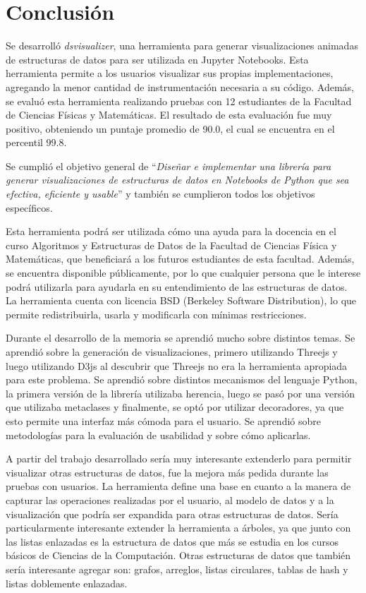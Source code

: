 \chapter{Conclusión}


Se desarrolló \textit{dsvisualizer}, una herramienta para generar visualizaciones animadas de estructuras de datos para ser utilizada en Jupyter Notebooks. Esta herramienta permite a los usuarios visualizar sus propias implementaciones, agregando la menor cantidad de instrumentación necesaria a su código. Además, se evaluó esta herramienta realizando pruebas con 12 estudiantes de la Facultad de Ciencias Físicas y Matemáticas. El resultado de esta evaluación fue muy positivo, obteniendo un puntaje promedio de 90.0, el cual se encuentra en el percentil 99.8.

Se cumplió el objetivo general de ``\textit{Diseñar e implementar una librería para generar visualizaciones de estructuras de datos en Notebooks de Python que sea efectiva, eficiente y usable}'' y también se cumplieron todos los objetivos específicos.

Esta herramienta podrá ser utilizada cómo una ayuda para la docencia en el curso Algoritmos y Estructuras de Datos de la Facultad de Ciencias Física y Matemáticas, que beneficiará a los futuros estudiantes de esta facultad. Además, se encuentra disponible públicamente, por lo que cualquier persona que le interese podrá utilizarla para ayudarla en su entendimiento de las estructuras de datos. La herramienta cuenta con licencia BSD (Berkeley Software Distribution), lo que permite redistribuirla, usarla y modificarla con mínimas restricciones.

Durante el desarrollo de la memoria se aprendió mucho sobre distintos temas. Se aprendió sobre la generación de visualizaciones, primero utilizando Threejs y luego utilizando D3js al descubrir que Threejs no era la herramienta apropiada para este problema. Se aprendió sobre distintos mecanismos del lenguaje Python, la primera versión de la librería utilizaba herencia, luego se pasó por una versión que utilizaba metaclases y finalmente, se optó por utilizar decoradores, ya que esto permite una interfaz más cómoda para el usuario. Se aprendió sobre metodologías para la evaluación de usabilidad y sobre cómo aplicarlas.

A partir del trabajo desarrollado sería muy interesante extenderlo para permitir visualizar otras estructuras de datos, fue la mejora más pedida durante las pruebas con usuarios. La herramienta define una base en cuanto a la manera de capturar las operaciones realizadas por el usuario, al modelo de datos y a la visualización que podría ser expandida para otras estructuras de datos. Sería particularmente interesante extender la herramienta a árboles, ya que junto con las listas enlazadas es la estructura de datos que más se estudia en los cursos básicos de Ciencias de la Computación. Otras estructuras de datos que también sería interesante agregar son: grafos, arreglos, listas circulares, tablas de hash y listas doblemente enlazadas.


